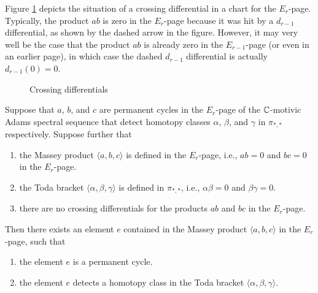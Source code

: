 Figure \ref{fig:crossing-differentials} depicts the situation of 
a crossing differential in a chart for the $E_{r}$-page.
Typically, the product $ab$ is zero in the $E_{r}$-page because
it was hit by a $d_{r-1}$ differential, as shown by the dashed
arrow in the figure.  However, 
it may very well be the case that the product $ab$ is already zero in 
the $E_{r-1}$-page (or even in an earlier page),
in which case the dashed $d_{r-1}$ differential is actually 
$d_{r-1} (0) = 0$.

\begin{figure}[!ht]
\caption{Crossing differentials}
\label{fig:crossing-differentials}


\end{figure}


\begin{thm}
\label{thm:Moss}
Suppose that $a$, $b$, and $c$ are permanent cycles in the $E_r$-page of the $\mathbb{C}$-motivic Adams spectral sequence that detect
homotopy classes $\alpha$, $\beta$, and $\gamma$ in $\pi_{*,*}$ respectively. Suppose further that
\begin{enumerate}
\item the Massey product $\langle a, b, c \rangle$ is defined in the 
$E_r$-page, i.e., $ab =0$ and $bc= 0$ in the $E_r$-page.
\item 
the Toda bracket $\langle \alpha, \beta, \gamma \rangle$ is defined in 
$\pi_{*,*}$, i.e., $\alpha \beta = 0$ and $\beta \gamma = 0$.
\item there are no crossing differentials for the products $ab$ and $bc$ in the $E_r$-page.
\end{enumerate}
Then there exists an element $e$ contained in the Massey product $\langle a, b, c \rangle$ in the $E_r$-page, such that
\begin{enumerate}
\item the element $e$ is a permanent cycle.
\item the element $e$ detects a homotopy class  in the Toda bracket	$\langle \alpha, \beta, \gamma \rangle$.	
\end{enumerate}
\end{thm}


